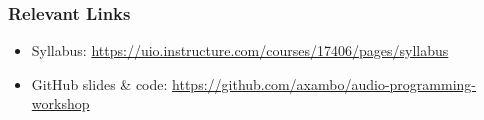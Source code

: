 \documentclass[screen, aspectratio=43]{beamer}
\begin{document}
%
\begin{frame}
\frametitle{Relevant Links}
\begin{itemize}
\item Syllabus: \url{https://uio.instructure.com/courses/17406/pages/syllabus}
\item GitHub slides \& code: \url{https://github.com/axambo/audio-programming-workshop}
\end{itemize}
\end{frame}
%
%
\end{document}
